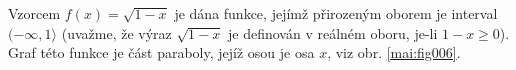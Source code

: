 \begin{mdframed}[style=mdexam]
  \begin{example}\label{MAI:exam018} 
    Vzorcem $f(x)=\sqrt{1-x}$ je dána funkce, jejímž přirozeným oborem je interval 
    $(-\infty,1\rangle$ (uvažme, že výraz $\sqrt{1-x}$ je definován v reálném oboru, je-li 
    $1-x\geq0$). Graf této funkce je část paraboly, jejíž osou je osa $x$, viz obr. 
    \ref{mai:fig006}.
    
    {\centering
    \captionsetup{type=figure}
    \label{mai:fig006}
    \par}
  \end{example}
\end{mdframed}